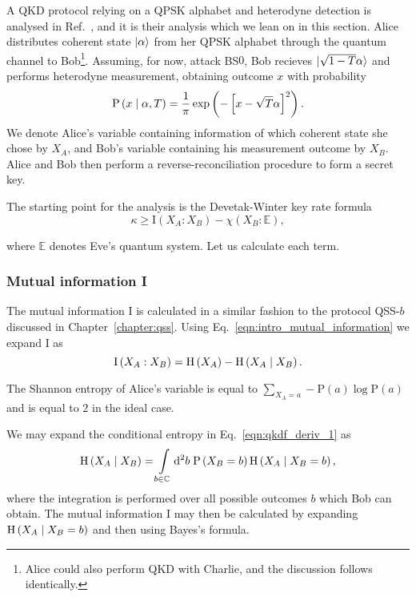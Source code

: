 A QKD protocol relying on a QPSK alphabet and heterodyne detection is analysed in Ref.~\cite{Papanastasiou2018}, and it is their analysis which we lean on in this section. Alice distributes coherent state $\ket{\alpha}$ from her QPSK alphabet through the quantum channel to Bob\footnote{Alice could also perform QKD with Charlie, and the discussion follows identically.}. Assuming, for now, attack BS$0$, Bob recieves $\ket{\sqrt{1-T}\alpha}$ and performs heterodyne measurement, obtaining outcome $x$ with probability
\begin{equation}
\text{P}\left(x\; \middle| \; \alpha, T\right) = \frac{1}{\pi}\exp\left( - \left[ x - \sqrt{T}\alpha\right]^2\right).
\end{equation}
We denote Alice's variable containing information of which coherent state she chose by $X_A$, and Bob's variable containing his measurement outcome by $X_B$. Alice and Bob then perform a reverse-reconciliation procedure \cite{Grosshans2002, Grosshans2003, Laudenbach2017} to form a secret key.

The starting point for the analysis is the Devetak-Winter key rate formula \cite{Devetak2004} 
\begin{equation}
\kappa \ge \text{I}\left(X_A : X_B\right) - \chi\left(X_B : \mathbb{E}\right),
\end{equation}

\noindent where $\mathbb{E}$ denotes Eve's quantum system. Let us calculate each term.

\subsubsection{Mutual information I}
The mutual information I is calculated in a similar fashion to the protocol QSS-$b$ discussed in Chapter~\ref{chapter:qss}. Using Eq.~\ref{eqn:intro_mutual_information} we expand $\text{I}$ as
\begin{equation}\label{eqn:qkdf_deriv_1}
\text{I}\left(X_A : X_B\right) = \text{H}\left(X_A\right) - \text{H}\left(X_A \; \middle| \; X_B\right).
\end{equation}

\noindent The Shannon entropy of Alice's variable is equal to $\sum_{X_A=a} - \text{P}\left(a\right) \log \text{P}\left(a\right)$ and is equal to $2$ in the ideal case.

We may expand the conditional entropy in Eq.~\ref{eqn:qkdf_deriv_1} as
\begin{equation}\label{eqn:qkdf_deriv_2}
\text{H}\left(X_A \; \middle| \; X_B\right) = \int\limits_{b \in \mathbb{C}} \mathop{}\!\mathrm{d^2} b \; \text{P}\left(X_B=b\right) \text{H}\left(X_A \; \middle| \; X_B=b\right),
\end{equation}
where the integration is performed over all possible outcomes $b$ which Bob can obtain. The mutual information I may then be calculated by expanding $\text{H}\left(X_A \; \middle| \; X_B=b\right)$ and then using Bayes's formula. 

